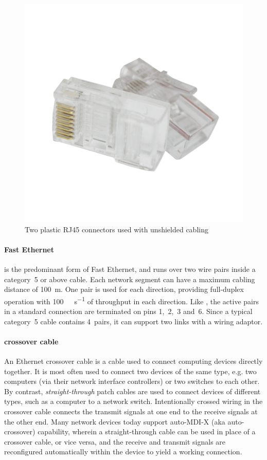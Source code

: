 \begin{figure}
   \centering
   \includegraphics[width=.5\textwidth]{images/physical/8p8c.png}
   \caption{Two plastic \acs{RJ45} connectors used with unshielded cabling}
   \label{fig:rj45}
\end{figure}

\paragraph{Fast Ethernet}
 is the predominant form of Fast Ethernet, and runs over two wire pairs inside a category~5 or above cable.
Each network segment can have a maximum cabling distance of \SI{100}{\metre}.
One pair is used for each direction, providing full-duplex operation with \SI{100}{\mega\bit\per\second} of throughput in each direction.
Like , the active pairs in a standard connection are terminated on pins 1,~2,~3 and~6.
Since a typical category~5 cable contains 4~pairs, it can support two  links with a wiring adaptor.

\paragraph{crossover cable}
An Ethernet crossover cable is a cable used to connect computing devices directly together.
It is most often used to connect two devices of the same type, e.g. two computers (via their network interface controllers) or two switches to each other.
By contrast, \emph{straight-through} patch cables are used to connect devices of different types, such as a computer to a network switch.
Intentionally crossed wiring in the crossover cable connects the transmit signals at one end to the receive signals at the other end.
Many network devices today support auto-\acs{MDI-X} (aka auto-crossover) capability, wherein a straight-through cable can be used in place of a crossover cable, or vice versa, and the receive and transmit signals are reconfigured automatically within the device to yield a working connection.

